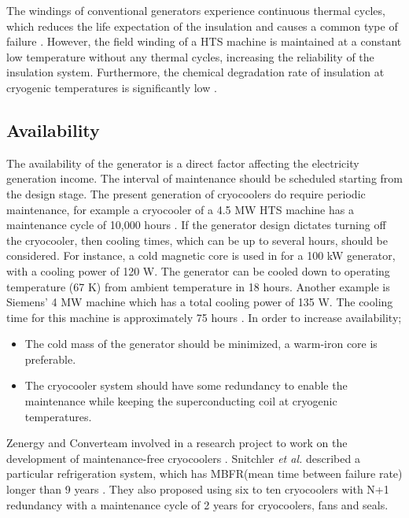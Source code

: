 \documentclass[final,peerreview,onecolumn]{IEEEtran}
\begin{document}
The windings of conventional generators experience continuous thermal cycles, which reduces the life expectation of the insulation and causes a common type of failure \cite{Gieras2008a,Spinato2009}. However, the field winding of a HTS machine is  maintained at a constant low temperature without any thermal cycles, increasing the reliability of the insulation system. Furthermore, the chemical degradation rate of insulation at cryogenic temperatures is significantly low \cite{Lewis2007}.


\subsection{Availability}

The availability of the generator is a direct factor affecting the electricity generation income. The interval of maintenance should be scheduled starting from the design stage. The present generation of cryocoolers do require periodic    maintenance, for example a cryocooler of a 4.5 MW HTS machine has a maintenance cycle of 10,000 hours \cite{Schiferl2006}. If the generator design dictates turning off the cryocooler, then cooling times, which can be up to several hours, should be considered. For instance, a cold magnetic core is used in \cite{Wen2009} for a 100 kW generator, with a cooling power of 120 W. The generator can be cooled down to operating temperature (67 K) from ambient temperature in 18 hours. Another example is Siemens' 4 MW machine which has a total cooling power of 135 W. The cooling time for this machine is approximately 75 hours \cite{Klaus2006}. In order to increase availability;

\begin{itemize}
\item The cold mass of the generator should be minimized, a warm-iron core is preferable.
\item The cryocooler system should have some redundancy to enable the maintenance while keeping the superconducting coil at cryogenic temperatures.
\end{itemize}

Zenergy and Converteam involved in a research project to work on the development of maintenance-free cryocoolers \cite{Lewis2007}. Snitchler \textit{et al.} described a particular refrigeration system, which has MBFR(mean time between failure rate) longer than 9 years \cite{Snitchler2010}. They also proposed using six to ten cryocoolers with N+1 redundancy with a maintenance cycle of 2 years for cryocoolers, fans and seals.
\end{document}
